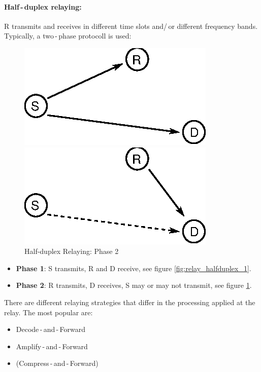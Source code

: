 \documentclass[a4paper, 10pt]{article}
\begin{document}
\paragraph{Half\,-\,duplex relaying:} 
R transmits and receives in different time slots and/\,or different frequency bands. Typically, a two\,-\,phase protocoll is used:
\begin{figure}[ht]
	\begin{minipage}[t]{0.43\textwidth}
		\includegraphics[width = \textwidth]{Relay_HalfDuplex_1}	
		\caption{Half-duplex Relaying: Phase 1}
		\label{fig:relay_halfduplex_1}	
	\end{minipage}
	\hfill
	\begin{minipage}[t]{0.43\textwidth}
		\includegraphics[width = \textwidth]{Relay_HalfDuplex_2}	
		\caption{Half-duplex Relaying: Phase 2}
		\label{fig:relay_halfduplex_2}
	\end{minipage}
\end{figure}
\begin{itemize}
	\item[] \textbf{Phase 1}: S transmits, R and D receive, see figure \ref{fig:relay_halfduplex_1}.
	\item[] \textbf{Phase 2}: R transmits, D receives, S may or may not transmit, see figure \ref{fig:relay_halfduplex_2}.
\end{itemize}
There are different relaying strategies that differ in the processing applied at the relay. The most popular are:
\begin{itemize}
	\item Decode\,-\,and\,-\,Forward
	\item Amplify\,-\,and\,-\,Forward
	\item (Compress\,-\,and\,-\,Forward)
\end{itemize}
\end{document}
